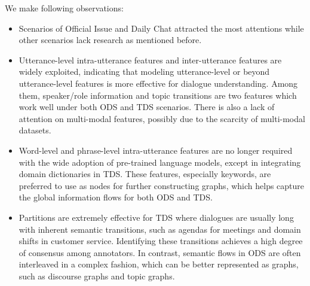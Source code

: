 \begin{table}
\begin{tabular}{|l|ccc|cc|c|}
		
		\bottomrule

	\end{tabular}
	\label{tab:correlation}
\end{table}


We make following observations:
\begin{itemize}

	\item Scenarios of Official Issue and Daily Chat attracted the most 
	attentions while other scenarios lack research as mentioned before. 

		\item Utterance-level intra-utterance features and inter-utterance 
	features are widely exploited, indicating that modeling utterance-level or 
	beyond utterance-level features is more effective for dialogue 
	understanding. Among them, speaker/role information and topic transitions are 
	two features which work well 
	under both ODS and TDS scenarios. There is also a lack of attention on 
	multi-modal features, possibly due to the scarcity of multi-modal datasets.

		\item Word-level and phrase-level intra-utterance features are no longer
	required with the wide adoption of pre-trained language models, except in
	integrating domain dictionaries in TDS. These features, especially keywords,
	are preferred to use as nodes for further constructing graphs, which helps 
	capture the global information flows for both ODS and TDS. 

		\item Partitions are extremely effective for TDS where dialogues 
	are usually long with inherent semantic transitions, such as agendas for meetings and domain shifts in customer service. 
	Identifying these transitions achieves a high degree of consensus among annotators. 
	In contrast, semantic flows in ODS are often interleaved in a complex fashion,
	which can be better represented as graphs, such as discourse graphs and topic graphs.

\end{itemize}




